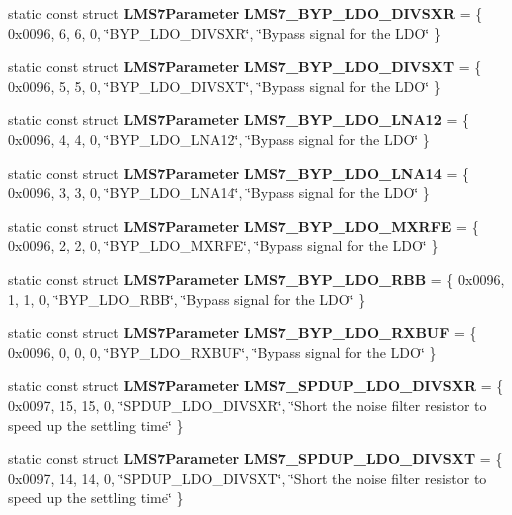 \begin{DoxyCompactItemize}
\item 
static const struct {\bf L\+M\+S7\+Parameter} {\bf L\+M\+S7\+\_\+\+B\+Y\+P\+\_\+\+L\+D\+O\+\_\+\+D\+I\+V\+S\+XR} = \{ 0x0096, 6, 6, 0, \char`\"{}\+B\+Y\+P\+\_\+\+L\+D\+O\+\_\+\+D\+I\+V\+S\+X\+R\char`\"{}, \char`\"{}\+Bypass signal for the L\+D\+O\char`\"{} \}
\item 
static const struct {\bf L\+M\+S7\+Parameter} {\bf L\+M\+S7\+\_\+\+B\+Y\+P\+\_\+\+L\+D\+O\+\_\+\+D\+I\+V\+S\+XT} = \{ 0x0096, 5, 5, 0, \char`\"{}\+B\+Y\+P\+\_\+\+L\+D\+O\+\_\+\+D\+I\+V\+S\+X\+T\char`\"{}, \char`\"{}\+Bypass signal for the L\+D\+O\char`\"{} \}
\item 
static const struct {\bf L\+M\+S7\+Parameter} {\bf L\+M\+S7\+\_\+\+B\+Y\+P\+\_\+\+L\+D\+O\+\_\+\+L\+N\+A12} = \{ 0x0096, 4, 4, 0, \char`\"{}\+B\+Y\+P\+\_\+\+L\+D\+O\+\_\+\+L\+N\+A12\char`\"{}, \char`\"{}\+Bypass signal for the L\+D\+O\char`\"{} \}
\item 
static const struct {\bf L\+M\+S7\+Parameter} {\bf L\+M\+S7\+\_\+\+B\+Y\+P\+\_\+\+L\+D\+O\+\_\+\+L\+N\+A14} = \{ 0x0096, 3, 3, 0, \char`\"{}\+B\+Y\+P\+\_\+\+L\+D\+O\+\_\+\+L\+N\+A14\char`\"{}, \char`\"{}\+Bypass signal for the L\+D\+O\char`\"{} \}
\item 
static const struct {\bf L\+M\+S7\+Parameter} {\bf L\+M\+S7\+\_\+\+B\+Y\+P\+\_\+\+L\+D\+O\+\_\+\+M\+X\+R\+FE} = \{ 0x0096, 2, 2, 0, \char`\"{}\+B\+Y\+P\+\_\+\+L\+D\+O\+\_\+\+M\+X\+R\+F\+E\char`\"{}, \char`\"{}\+Bypass signal for the L\+D\+O\char`\"{} \}
\item 
static const struct {\bf L\+M\+S7\+Parameter} {\bf L\+M\+S7\+\_\+\+B\+Y\+P\+\_\+\+L\+D\+O\+\_\+\+R\+BB} = \{ 0x0096, 1, 1, 0, \char`\"{}\+B\+Y\+P\+\_\+\+L\+D\+O\+\_\+\+R\+B\+B\char`\"{}, \char`\"{}\+Bypass signal for the L\+D\+O\char`\"{} \}
\item 
static const struct {\bf L\+M\+S7\+Parameter} {\bf L\+M\+S7\+\_\+\+B\+Y\+P\+\_\+\+L\+D\+O\+\_\+\+R\+X\+B\+UF} = \{ 0x0096, 0, 0, 0, \char`\"{}\+B\+Y\+P\+\_\+\+L\+D\+O\+\_\+\+R\+X\+B\+U\+F\char`\"{}, \char`\"{}\+Bypass signal for the L\+D\+O\char`\"{} \}
\item 
static const struct {\bf L\+M\+S7\+Parameter} {\bf L\+M\+S7\+\_\+\+S\+P\+D\+U\+P\+\_\+\+L\+D\+O\+\_\+\+D\+I\+V\+S\+XR} = \{ 0x0097, 15, 15, 0, \char`\"{}\+S\+P\+D\+U\+P\+\_\+\+L\+D\+O\+\_\+\+D\+I\+V\+S\+X\+R\char`\"{}, \char`\"{}\+Short the noise filter resistor to speed up the settling time\char`\"{} \}
\item 
static const struct {\bf L\+M\+S7\+Parameter} {\bf L\+M\+S7\+\_\+\+S\+P\+D\+U\+P\+\_\+\+L\+D\+O\+\_\+\+D\+I\+V\+S\+XT} = \{ 0x0097, 14, 14, 0, \char`\"{}\+S\+P\+D\+U\+P\+\_\+\+L\+D\+O\+\_\+\+D\+I\+V\+S\+X\+T\char`\"{}, \char`\"{}\+Short the noise filter resistor to speed up the settling time\char`\"{} \}

\end{DoxyCompactItemize}
